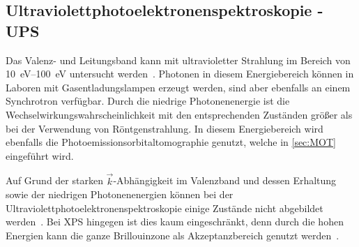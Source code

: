         \subsection{Ultraviolettphotoelektronenspektroskopie - UPS} \label{sec:UPS}
            Das Valenz- und Leitungsband kann mit ultravioletter Strahlung im Bereich von \SIrange{10}{100}{\electronvolt} untersucht werden~\cite{Fauster}.
            Photonen in diesem Energiebereich können in Laboren mit Gasentladungslampen erzeugt werden, sind aber ebenfalls an einem Synchrotron verfügbar.
            Durch die niedrige Photonenenergie ist die Wechselwirkungswahrscheinlichkeit mit den entsprechenden Zuständen größer als bei der Verwendung von Röntgenstrahlung.
            In diesem Energiebereich wird ebenfalls die Photoemissionsorbitaltomographie genutzt, welche in \autoref{sec:MOT} eingeführt wird.

            Auf Grund der starken $\vec{k}$-Abhängigkeit im Valenzband und dessen Erhaltung sowie der niedrigen Photonenenergien können bei der Ultraviolettphotoelektronenspektroskopie einige Zustände nicht abgebildet werden~\cite{Hüfner}.
            Bei XPS hingegen ist dies kaum eingeschränkt, denn durch die hohen Energien kann die ganze Brillouinzone als Akzeptanzbereich genutzt werden~\cite{Hüfner}.

